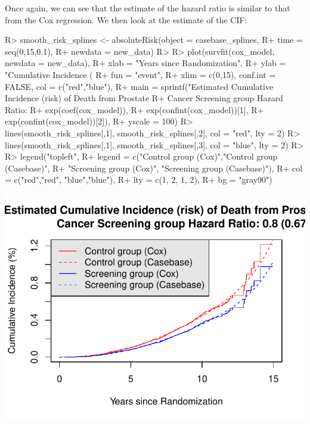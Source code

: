 \documentclass[
]{jss}
\begin{document}
Once again, we can see that the estimate of the hazard ratio is similar
to that from the Cox regression. We then look at the estimate of the
CIF:

\begin{CodeChunk}

\begin{CodeInput}
R> smooth_risk_splines <- absoluteRisk(object = casebase_splines, 
R+                                     time = seq(0,15,0.1), 
R+                                     newdata = new_data)
R> 
R> plot(survfit(cox_model, newdata = new_data),
R+      xlab = "Years since Randomization", 
R+      ylab = "Cumulative Incidence (%
R+      fun = "event",
R+      xlim = c(0,15), conf.int = FALSE, col = c("red","blue"), 
R+      main = sprintf("Estimated Cumulative Incidence (risk) of Death from Prostate 
R+                     Cancer Screening group Hazard Ratio: %
R+                     exp(coef(cox_model)), 
R+                     exp(confint(cox_model))[1], 
R+                     exp(confint(cox_model))[2]),
R+      yscale = 100)
R> lines(smooth_risk_splines[,1], smooth_risk_splines[,2], col = "red", lty = 2)
R> lines(smooth_risk_splines[,1], smooth_risk_splines[,3], col = "blue", lty = 2)
R> 
R> legend("topleft", 
R+        legend = c("Control group (Cox)","Control group (Casebase)",
R+                   "Screening group (Cox)", "Screening group (Casebase)"), 
R+        col = c("red","red", "blue","blue"),
R+        lty = c(1, 2, 1, 2), 
R+        bg = "gray90")
\end{CodeInput}


\begin{center}\includegraphics{../figures/erspc-casebase-splines-cif-1} \end{center}

\end{CodeChunk}
\end{document}
